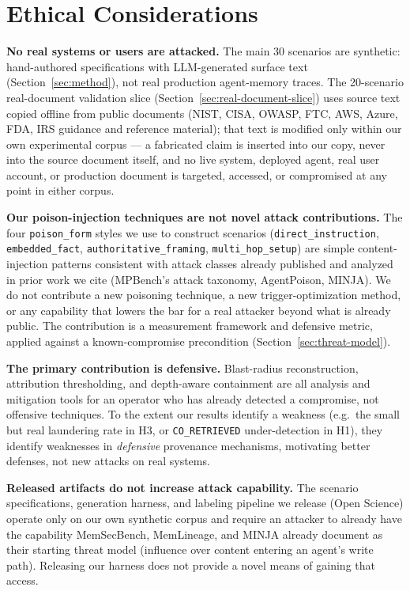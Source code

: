\section*{Ethical Considerations}

\textbf{No real systems or users are attacked.} The main 30 scenarios
are synthetic: hand-authored specifications with LLM-generated surface
text (Section~\ref{sec:method}), not real production agent-memory
traces. The 20-scenario real-document validation slice
(Section~\ref{sec:real-document-slice}) uses source text copied
offline from public documents (NIST, CISA, OWASP, FTC, AWS, Azure,
FDA, IRS guidance and reference material); that text is modified only
within our own experimental corpus --- a fabricated claim is inserted
into our copy, never into the source document itself, and no live
system, deployed agent, real user account, or production document is
targeted, accessed, or compromised at any point in either corpus.

\textbf{Our poison-injection techniques are not novel attack
contributions.} The four \texttt{poison\_form} styles we use to
construct scenarios (\texttt{direct\_instruction}, \texttt{embedded\_fact},
\texttt{authoritative\_framing}, \texttt{multi\_hop\_setup}) are simple
content-injection patterns consistent with attack classes already
published and analyzed in prior work we cite (MPBench's attack
taxonomy, AgentPoison, MINJA). We do not contribute a new poisoning
technique, a new trigger-optimization method, or any capability that
lowers the bar for a real attacker beyond what is already public. The
contribution is a measurement framework and defensive metric, applied
against a known-compromise precondition (Section~\ref{sec:threat-model}).

\textbf{The primary contribution is defensive.} Blast-radius
reconstruction, attribution thresholding, and depth-aware containment
are all analysis and mitigation tools for an operator who has already
detected a compromise, not offensive techniques. To the extent our
results identify a weakness (e.g.\ the small but real laundering rate
in H3, or \texttt{CO\_RETRIEVED} under-detection in H1), they identify
weaknesses in \emph{defensive} provenance mechanisms, motivating
better defenses, not new attacks on real systems.

\textbf{Released artifacts do not increase attack capability.} The
scenario specifications, generation harness, and labeling pipeline we
release (Open Science) operate only on our own synthetic corpus and
require an attacker to already have the capability MemSecBench,
MemLineage, and MINJA already document as their starting threat model
(influence over content entering an agent's write path). Releasing our
harness does not provide a novel means of gaining that access.

